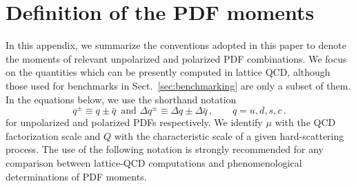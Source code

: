 \section{Definition of the PDF moments}
\label{app:notation}

In this appendix, we summarize the conventions adopted in this paper to denote 
the moments of relevant unpolarized and polarized PDF combinations.
%
We focus on the quantities which can be presently computed in lattice QCD,
although those used for benchmarks in Sect.~\ref{sec:benchmarking} are only
a subset of them.
%
In the equations below, we use the shorthand notation
\begin{equation}
q^\pm \equiv q\pm\bar{q}\, 
\text{ and }
\Delta q^\pm \equiv \Delta q\pm\Delta\bar{q}\, 
,\qquad q=u,d,s,c \, .
\end{equation}
%
for unpolarized and polarized PDFs respectively.
%
We identify $\mu$ with the QCD factorization scale and $Q$ with the 
characteristic scale of a given hard-scattering process.
%
The use of the following notation is strongly recommended for any comparison 
between lattice-QCD computations and phenomenological determinations of 
PDF moments.

